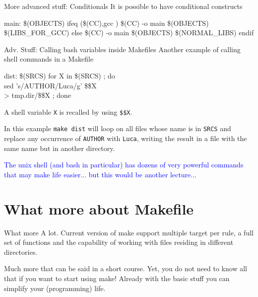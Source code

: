\documentclass[10pt,aspectratio=169]{beamer}
\begin{document}
\begin{frame}{More advanced stuff: Conditionals}
	It is possible to have conditional constructs
	\begin{semiverbatim}
		main: \$(OBJECTS) \newline
		ifeq (\$(CC),gcc )\newline
		\phantom{xx} \$(CC) -o main \$(OBJECTS) \$(LIBS\_FOR\_GCC)\newline
		else\newline
		\phantom{xx} \$(CC) -o main \$(OBJECTS) \$(NORMAL\_LIBS)\newline
		endif
	\end{semiverbatim}
\end{frame}




\begin{frame}{Adv. Stuff: Calling bash variables inside Makefiles}
Another example of calling shell commands in a Makefile
\begin{semiverbatim}
dist: \$(SRCS)\newline
\phantom{xx} for X in \$(SRCS) ; do \\ \newline
                 sed 's/AUTHOR/Luca/g' \$\$X \\ \newline
                 > tmp.dir/\$\$X ; done \newline
\end{semiverbatim}
A shell variable \texttt{X} is recalled by using \texttt{\$\$X}.
\medskip

In this example \texttt{make dist} will loop on all files whose name is in \texttt{SRCS} and replace any occurrence of 
\texttt{AUTHOR} with \texttt{Luca}, writing the result in a file with the same name but in another directory. 
\medskip

\textcolor{blue}{The unix shell (and bash in particular) has dozens of very powerful commands that may make life easier... 
but this would be another lecture...}


\end{frame}


\section*{What more about Makefile}

\begin{frame}{What more} A lot. Current version of make support
  \alert{multiple target per rule}, a full
  set of \alert{functions} and the capability of working with files
  residing in different directories.  
\smallskip

Much more that can be said in a short course. Yet, you do not need to
know all that if you want to start using make! Already with the basic
stuff you can simplify your (programming) life.
\end{frame}
\end{document}
